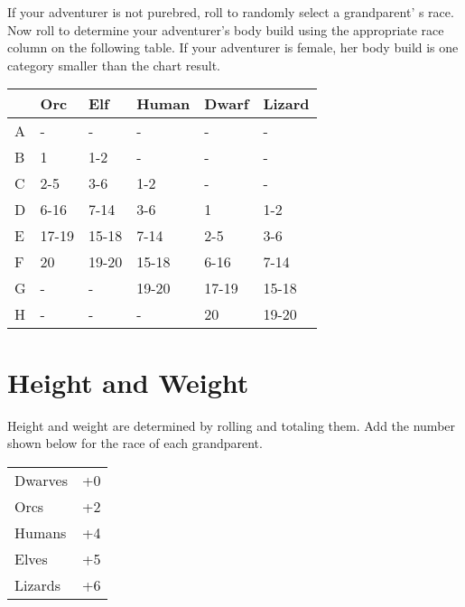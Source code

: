 \begin{multicols*}{2}
\normalsize
If your adventurer is not purebred, roll  to randomly select a grandparent' s race. Now roll  to determine your adventurer's body build using the appropriate race column on the following table. If your adventurer is female, her body build is one category smaller than the chart result.
\vspace{-5pt}
\begin{normbox}
\indx{}
\begin{tabular}{@{} l l l l l l }
\tiny
 & Orc & Elf & Human & Dwarf & Lizard\\
\midrule
\small
A & - & - & - & - & -\\
B & 1 & 1-2 & - & - & -\\
C & 2-5 & 3-6 & 1-2 & - & -\\
D & 6-16 & 7-14 & 3-6 & 1 & 1-2\\
E & 17-19 & 15-18 & 7-14 & 2-5 & 3-6\\
F & 20 & 19-20 & 15-18 & 6-16 & 7-14\\
G & - & - & 19-20 & 17-19 & 15-18\\
H & - & - & - & 20 & 19-20\\
\end{tabular}
\end{normbox}
\section{Height and Weight}
\begin{multicols*}{2}
Height and weight are determined by rolling  and totaling them. Add the number shown below for the race of each grandparent.
\begin{normbox}
\begin{tabular}{l l}
\small
Dwarves & +0\\
Orcs & +2\\
Humans & +4\\
Elves & +5\\
Lizards & +6\\
\end{tabular}
\end{normbox}
\normalsize
\end{multicols*}

\end{multicols*}
